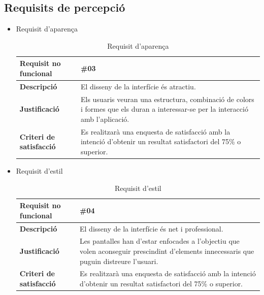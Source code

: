 \subsection{Requisits de percepció}

\begin{itemize}

\item{Requisit d'aparença}

\begin{table}[!h]
\centering
\begin{tabular}{|l|M|}
\hline
\textbf{Requisit no funcional }& \#03    \\ \hline
\textbf{Descripció} &  El disseny de la interfície és atractiu.
 \\ \hline
\textbf{Justificació} & Els usuaris veuran una estructura, combinació de colors i formes que els duran a interessar-se per la interacció amb l’aplicació.
\\ \hline
\textbf{Criteri de satisfacció} & Es realitzarà una enquesta de satisfacció amb la intenció d’obtenir un resultat satisfactori del 75\% o superior.
 \\ \hline
\end{tabular}
\label{}
\caption{Requisit d'aparença}
\end{table}

\clearpage

\item{Requisit d'estil}

\begin{table}[!h]
\centering
\begin{tabular}{|l|M|}
\hline
\textbf{Requisit no funcional }& \#04    \\ \hline
\textbf{Descripció} & El disseny de la interfície és net i professional.
 \\ \hline
\textbf{Justificació} & Les pantalles han d’estar enfocades a l’objectiu que
volen aconseguir prescindint d’elements innecessaris
que puguin distreure l’usuari.
  \\ \hline
\textbf{Criteri de satisfacció} & Es realitzarà una enquesta de satisfacció amb la intenció d’obtenir un resultat satisfactori del 75\% o superior.
  \\ \hline
\end{tabular}
\label{}
\caption{Requisit d'estil}
\end{table}

\end{itemize}

